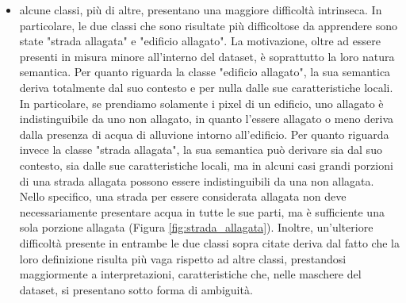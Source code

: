 \begin{itemize}
    
    \item alcune classi, più di altre, presentano una maggiore difficoltà intrinseca. In particolare, le due classi che sono risultate più difficoltose da apprendere sono state "strada allagata" e "edificio allagato". La motivazione, oltre ad essere presenti in misura minore all'interno del dataset, è soprattutto la loro natura semantica. Per quanto riguarda la classe "edificio allagato", la sua semantica deriva totalmente dal suo contesto e per nulla dalle sue caratteristiche locali. In particolare, se prendiamo solamente i pixel di un edificio, uno allagato è indistinguibile da uno non allagato, in quanto l'essere allagato o meno deriva dalla presenza di acqua di alluvione intorno all'edificio.
    Per quanto riguarda invece la classe "strada allagata", la sua semantica può derivare sia dal suo contesto, sia dalle sue caratteristiche locali, ma in alcuni casi grandi porzioni di una strada allagata possono essere indistinguibili da una non allagata. Nello specifico, una strada per essere considerata allagata non deve necessariamente presentare acqua in tutte le sue parti, ma è sufficiente una sola porzione allagata (Figura \ref{fig:strada_allagata}). 
    Inoltre, un'ulteriore difficoltà presente in entrambe le due classi sopra citate deriva dal fatto che la loro definizione risulta più vaga rispetto ad altre classi, prestandosi maggiormente a interpretazioni, caratteristiche che, nelle maschere del dataset, si presentano sotto forma di ambiguità.


\end{itemize}
